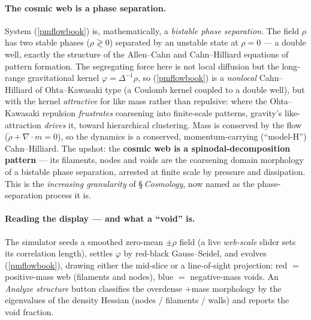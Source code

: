 \paragraph{The cosmic web is a phase separation.} System (\ref{pmflowbook}) is, mathematically, a \emph{bistable
phase separation}. The field $\rho$ has two stable phases ($\rho\gtrless0$) separated by an unstable state at
$\rho=0$ --- a double well, exactly the structure of the Allen--Cahn and Cahn--Hilliard equations of pattern
formation. The segregating force here is not local diffusion but the long-range gravitational kernel
$\varphi=\Delta^{-1}\rho$, so (\ref{pmflowbook}) is a \emph{nonlocal} Cahn--Hilliard of Ohta--Kawasaki type (a
Coulomb kernel coupled to a double well), but with the kernel \emph{attractive} for like mass rather than repulsive:
where the Ohta--Kawasaki repulsion \emph{frustrates} coarsening into finite-scale patterns, gravity's
like-attraction \emph{drives} it, toward hierarchical clustering. Mass is conserved by the flow
($\dot\rho+\nabla\cdot m=0$), so the dynamics is a conserved, momentum-carrying (``model-H'') Cahn--Hilliard. The
upshot: the \textbf{cosmic web is a spinodal-decomposition pattern} --- its filaments, nodes and voids are the
coarsening domain morphology of a bistable phase separation, arrested at finite scale by pressure and dissipation.
This is the \emph{increasing granularity} of \S\,\textit{Cosmology}, now named as the phase-separation process it is.

\paragraph{Reading the display --- and what a ``void'' is.} The simulator seeds a smoothed zero-mean $\pm\rho$ field
(a live \emph{web-scale} slider sets its correlation length), settles $\varphi$ by red-black Gauss--Seidel, and
evolves (\ref{pmflowbook}), drawing either the mid-slice or a line-of-sight projection: red $=$ positive-mass web
(filaments and nodes), blue $=$ negative-mass voids. An \emph{Analyze structure} button classifies the overdense
$+$mass morphology by the eigenvalues of the density Hessian (nodes / filaments / walls) and reports the void
fraction.

